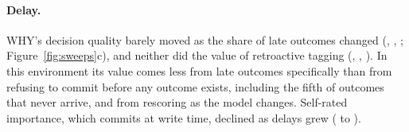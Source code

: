 \paragraph{Delay.} WHY's decision quality barely moved as the share of late outcomes changed (, , ; Figure~\ref{fig:sweeps}c), and neither did the value of retroactive tagging (, , ). In this environment its value comes less from late outcomes specifically than from refusing to commit before any outcome exists, including the fifth of outcomes that never arrive, and from rescoring as the model changes. Self-rated importance, which commits at write time, declined as delays grew ( to ).

